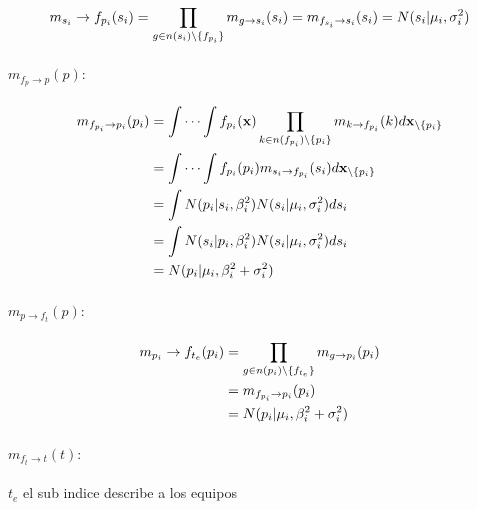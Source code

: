 \documentclass[11pt,twoside,spanish]{report} %
\begin{document}
\begin{equation}
	\centering
	m_{s_i}\rightarrow f_{p_i}(s_i) = \prod_{g\in n(s_i)\backslash\{f_{p_i}\}} m_{g\rightarrow s_i}(s_i)
	= m_{f_{s_i}\rightarrow s_i}(s_i)
	=  N(s_i \vert \mu_i,\sigma_i^2)
\end{equation}

\paragraph{$m_{f_{p}\rightarrow p}(p):$}

\begin{equation}
	\centering
	\begin{split}
		m_{f_{p_i}\rightarrow p_i}(p_i) & = \int\cdots\int f_{p_i}(\textbf{x})\prod_{k\in n(f_{p_i})\backslash\{p_i\}} m_{k\rightarrow f_{p_i}}(k)d\textbf{x}_{\backslash \{p_i\}} \\
		& = \int\cdots\int f_{p_i}(p_i) m_{s_i\rightarrow f_{p_i}}(s_i)d\textbf{x}_{\backslash \{p_i\}} \\
		& = \int N(p_i \vert s_i,\beta_i^2) N(s_i \vert \mu_i,\sigma_i^2)ds_i \\
		& = \int N(s_i \vert p_i,\beta_i^2) N(s_i \vert \mu_i,\sigma_i^2)ds_i \\
		& =  N(p_i \vert \mu_i,\beta_i^2+\sigma_i^2)
	\end{split}
\end{equation}

\paragraph{$m_{p\rightarrow f_{t}}(p):$}

\begin{equation}
	\centering
	\begin{split}
		m_{p_i}\rightarrow f_{t_e}(p_i) & = \prod_{g\in n(p_i)\backslash\{f_{t_e}\}} m_{g\rightarrow p_i}(p_i) \\
		& = m_{f_{p_i}\rightarrow p_i}(p_i) \\
		& =  N(p_i \vert \mu_i,\beta_i^2+\sigma_i^2)
	\end{split}
\end{equation}

\paragraph{$m_{f_{t}\rightarrow t}(t):$} $t_e$ el sub indice describe a los equipos
\end{document}
